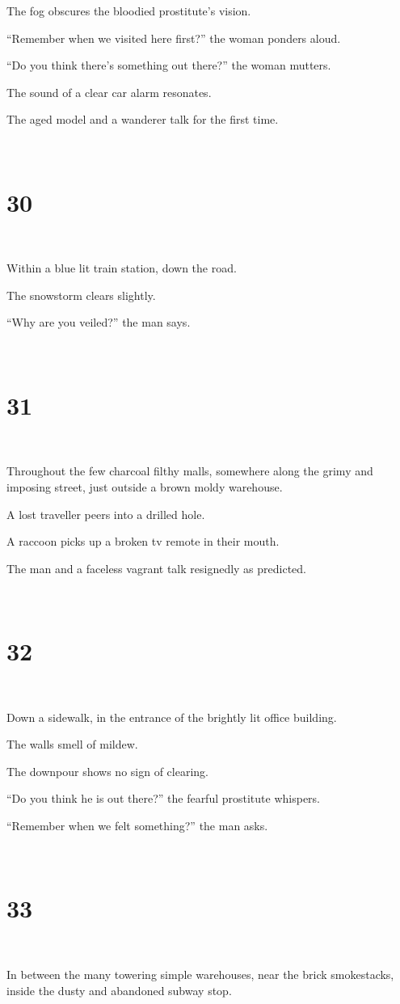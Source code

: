 \documentclass{report}
\begin{document}
The fog obscures the bloodied prostitute's vision.

``Remember when we visited here first?'' the woman ponders aloud.

``Do you think there's something out there?'' the woman mutters.

The sound of a clear car alarm resonates.

The aged model and a wanderer talk for the first time.

~
\chapter*{30}
~

Within a blue lit train station, down the road.

The snowstorm clears slightly.

``Why are you veiled?'' the man says.

~
\chapter*{31}
~

Throughout the few charcoal filthy malls, somewhere along the grimy and imposing street, just outside a brown moldy warehouse.

A lost traveller peers into a drilled hole.

A raccoon picks up a broken tv remote in their mouth.

The man and a faceless vagrant talk resignedly as predicted.

~
\chapter*{32}
~

Down a sidewalk, in the entrance of the brightly lit office building.

The walls smell of mildew.

The downpour shows no sign of clearing.

``Do you think he is out there?'' the fearful prostitute whispers.

``Remember when we felt something?'' the man asks.

~
\chapter*{33}
~

In between the many towering simple warehouses, near the brick smokestacks, inside the dusty and abandoned subway stop.
\end{document}
